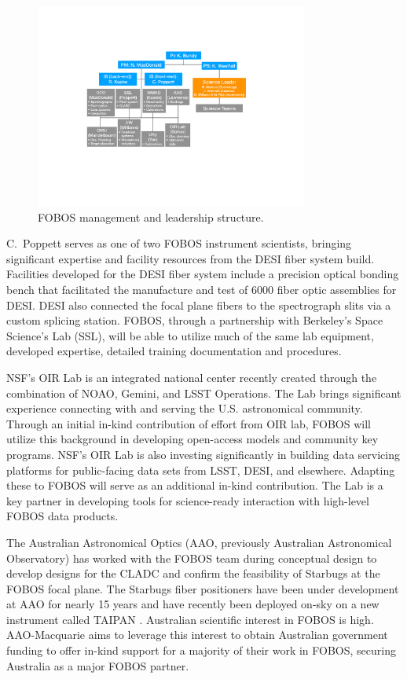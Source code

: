 \documentclass[oneside,11pt]{amsart}
\begin{document}
\begin{figure}[h!]
\vskip -0.1in
\includegraphics[width=0.8\textwidth]{org_chart_v3.pdf}
\caption{\small FOBOS management and leadership structure.}
\label{fig:org}
\end{figure}

 C.~Poppett serves
as one of two FOBOS instrument scientists, bringing significant
expertise and facility resources from the DESI fiber system build.
Facilities developed for the DESI fiber system include a precision
optical bonding bench that facilitated the manufacture and test of
6000 fiber optic assemblies for DESI. DESI also connected the focal
plane fibers to the spectrograph slits via a custom splicing station.
FOBOS, through a partnership with Berkeley's Space Science's Lab
(SSL), will be able to utilize much of the same lab equipment,
developed expertise, detailed training documentation and procedures.

 NSF’s OIR Lab is an integrated
national center recently created through the combination of NOAO,
Gemini, and LSST Operations. The Lab brings significant experience
connecting with and serving the U.S. astronomical community. Through
an initial in-kind contribution of effort from OIR lab, FOBOS will
utilize this background in developing open-access models and
community key programs. NSF’s OIR Lab is also investing significantly
in building data servicing platforms for public-facing data sets from
LSST, DESI, and elsewhere. Adapting these to FOBOS will serve as an
additional in-kind contribution. The Lab is a key partner in
developing tools for science-ready interaction with high-level FOBOS
data products.

 The
Australian Astronomical Optics (AAO, previously Australian
Astronomical Observatory) has worked with the FOBOS team during
conceptual design to develop designs for the CLADC and confirm the
feasibility of Starbugs at the FOBOS focal plane. The Starbugs fiber
positioners have been under development at AAO for nearly 15 years
and have recently been deployed on-sky on a new instrument called
TAIPAN \citep{staszak16}. Australian scientific interest in FOBOS is
high. AAO-Macquarie aims to leverage this interest to obtain
Australian government funding to offer in-kind support for a majority
of their work in FOBOS, securing Australia as a major FOBOS partner.
\end{document}
